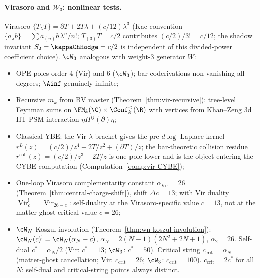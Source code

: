 \paragraph{Virasoro and $\mathcal{W}_3$: nonlinear tests.}
Virasoro $\{T {}_\lambda T\} = \partial T + 2T\lambda + (c/12)\lambda^3$
(Kac convention $\{a_\lambda b\} = \sum a_{(n)}b\,\lambda^n/n!$;
$T_{(3)}T = c/2$ contributes $(c/2)/3! = c/12$; the shadow
invariant $S_2 = \kappaChHodge = c/2$ is independent of
this divided-power coefficient choice). $\cW_3$
analogous with weight-$3$ generator $W$:
\begin{itemize}
\item OPE poles order $4$ (Vir) and $6$ ($\cW_3$); bar
 coderivations non-vanishing all degrees; $\Ainf$ genuinely
 infinite;
\item Recursive $m_k$ from BV master
 (Theorem~\ref{thm:vir-recursive}): tree-level Feynman sums on
 $\FM_k(\C) \times \Conf_k^{<}(\R)$ with vertices from
 Khan--Zeng 3d HT PSM interaction $\eta \Pi^{ij}(\partial) \eta$;
\item Classical YBE: the Vir $\lambda$-bracket gives the pre-\(d\log\)
 Laplace kernel
 $r^L(z) = (c/2)/z^4 + 2T/z^2 + (\partial T)/z$; the
 bar-theoretic collision residue
 $r^{\mathrm{coll}}(z) = (c/2)/z^3 + 2T/z$ is one pole lower and is
 the object entering the CYBE computation
 (Computation~\ref{comp:vir-CYBE});
\item One-loop Virasoro complementarity constant
 $\alpha_{\mathrm{Vir}} = 26$
 (Theorem~\ref{thm:central-charge-shift}), shift $\Delta c = 13$;
 with Vir duality $\operatorname{Vir}_c^! = \operatorname{Vir}_{26 - c}$:
 self-duality at the Virasoro-specific value $c = 13$, not at
 the matter-ghost critical value $c = 26$;
\item $\cW_N$ Koszul involution
 (Theorem~\ref{thm:wn-koszul-involution}):
 $\cW_N(c)^! = \cW_N(\alpha_N - c)$,
 $\alpha_N = 2(N-1)(2N^2 + 2N + 1)$, $\alpha_2 = 26$. Self-dual
 $c^* = \alpha_N/2$ (Vir: $c^* = 13$; $\cW_3$: $c^* = 50$).
 Critical string $c_{\mathrm{crit}} = \alpha_N$ (matter-ghost
 cancellation; Vir: $c_{\mathrm{crit}} = 26$; $\cW_3$:
 $c_{\mathrm{crit}} = 100$). $c_{\mathrm{crit}} = 2c^*$ for all
 $N$: self-dual and critical-string points always distinct.
\end{itemize}

